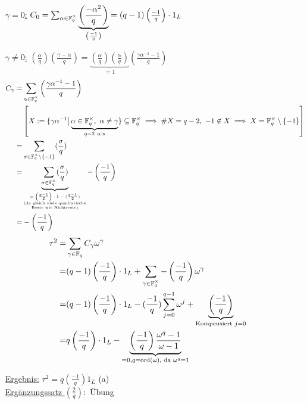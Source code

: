 \documentclass[a4paper,twoside,DIV15,BCOR12mm]{scrbook}
\begin{document}
\begin{itemize}
    \item[\underline{$\gamma = 0$:}] $C_0 = \sum_{\alpha \in \mathbb{F}_q^\times}\underbrace{\left(\frac{-\alpha^2}{q}\right)}_{\left(\frac{-1}{q}\right)} = (q-1)\left(\frac{-1}{q}\right)\cdot
 1_L$
    \item[\underline{$\gamma \not= 0$:}] $\left(\frac{\alpha}{q}\right)\left(\frac{\gamma - \alpha}{q}\right) = \underbrace{\left(\frac{\alpha}{q}\right)\left(\frac{\alpha}{q}\right)}_{= 1}\left(\frac{\gamma \alpha^{-1} -1}{q}\right)$
    \begin{align*}
        C_\gamma =& \sum_{\alpha \in \mathbb{F}_q^\times}\left(\frac{\gamma \alpha^{-1} - 1}{q}\right) \\
        & \left[X := \{\gamma \alpha^{-1} \big| \underbrace{\alpha \in \mathbb{F}_q^\times,\ \alpha \neq \gamma}_{q-2 \ \alpha\text{'s}}\} \subseteq \mathbb{F}_q^\times \implies \#X = q-2,\ -1 \not\in X \implies X = \mathbb{F}_q^\times \setminus \{-1\}\right] \\
        =& \sum_{\sigma \in \mathbb{F}_q^\times \backslash \{-1\}} (\frac{\sigma}{q}) \\
        =& \underbrace{\sum_{\sigma \in \mathbb{F}_q^\times} (\frac{\sigma}{q})}_{\tiny\begin{matrix}
             =\left(\frac{q-1}{2}\right)\cdot 1 - (\frac{q-1}{2})\\
             \text{(da gleich viele quadratische}\\ \text{Reste wie Nichtreste)}
             \end{matrix}}-\left(\frac{-1}{q}\right) \\
        =& - \left(\frac{-1}{q}\right)
    \end{align*}
    \begin{align*}
        \tau^2 =& \sum_{\gamma \in \mathbb{F}_q}C_\gamma \omega^\gamma \\
        =& (q-1)\left(\frac{-1}{q}\right)\cdot 1_L + \sum_{\gamma \in \mathbb{F}_q^\times}-\left(\frac{-1}{q}\right)\omega^\gamma \\
        =& (q-1)\left(\frac{-1}{q}\right)\cdot 1_L - (\frac{-1}{q})\sum_{j=0}^{q-1}\omega^j + \underbrace{\left(\frac{-1}{q}\right)}_{\text{Kompensiert } j=0} \\
        =& q\left(\frac{-1}{q}\right)\cdot 1_L - \underbrace{\left(\frac{-1}{q}\right)\frac{\omega^q - 1}{\omega - 1}}_{=0, q = \mathop{\rm ord}\nolimits(\omega) \text{, da } \omega^q = 1}
    \end{align*}
    \item []    \underline{Ergebnis:} $\tau^2 = q\left(\frac{-1}{q}\right) \dot 1_L$ (a)\\
        \underline{Ergänzungssatz $\left(\frac{2}{q}\right):$} Übung
\end{itemize}
\end{document}
